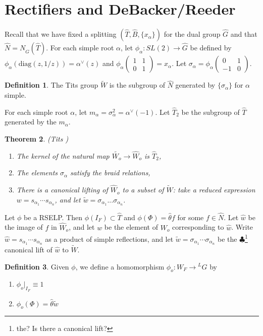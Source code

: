 \documentclass[11pt]{amsart}
\theoremstyle{plain}
\newtheorem{theorem}{Theorem}[section]
\newcommand{\MAxxx}[1]{$\clubsuit$\footnote{#1}}
\theoremstyle{definition}
\newtheorem{definition}[theorem]{Definition}
\newcommand{\mat}[4]{\left( \begin{array}{cc} {#1} & {#2} \\ {#3} & {#4}
\end{array} \right)}
\begin{document}
\section{Rectifiers and DeBacker/Reeder}\label{mainresults}

Recall that we have fixed a splitting $(\hat{T}, \hat{B}, \{x_{\alpha} \})$
for the dual group $\hat{G}$ and that $\hat{N} = N_{\hat{G}}(\hat{T})$.
For each simple root $\alpha$, let $\phi_{\alpha} : SL(2) \rightarrow \hat{G}$
be defined by $\phi_{\alpha}(\mathrm{diag}(z,1/z)) = \alpha^{\vee}(z)$
and $\phi_{\alpha}\mat{1}{1}{0}{1} = x_{\alpha}$. Let
$\sigma_{\alpha} = \phi_{\alpha}\mat{0}{1}{-1}{0}$.

\begin{definition}
  The Tits group $\widetilde{W}$ is the subgroup of $\hat{N}$
  generated by $\{\sigma_{\alpha} \}$ for $\alpha$ simple.
\end{definition}

For each simple root $\alpha$, let $m_{\alpha} = \sigma_{\alpha}^2 = \alpha^{\vee}(-1)$.
Let $\hat{T}_2$ be the subgroup of $\hat{T}$ generated by the $m_{\alpha}$.

\begin{theorem}{(Tits \cite{tits})}
\begin{enumerate}

\item The kernel of the natural map $\widetilde{W_o} \rightarrow \hat{W}_o$
  is $\hat{T}_2$,
\item The elements $\sigma_{\alpha}$ satisfy the braid relations,
\item There is a canonical lifting of $\hat{W}_o$ to a subset of
  $\widetilde{W}$: take a reduced expression $w = s_{\alpha_1} \cdots s_{\alpha_n}$,
  and let $\tilde{w} = \sigma_{\alpha_1} ... \sigma_{\alpha_n}$.
\end{enumerate}
\end{theorem}

Let $\phi$ be a RSELP.  Then $\phi(I_F) \subset \hat{T}$ and
$\phi(\Phi) = \hat{\theta} f$ for some $f \in \hat{N}$.  Let $\hat{w}$
be the image of $f$ in $\hat{W}_o$, and let $w$ be the element of
$W_o$ corresponding to $\hat{w}$.  Write $\hat{w} = s_{\alpha_1} \cdots s_{\alpha_n}$
as a product of simple reflections, and let
$\tilde{w} = \sigma_{\alpha_1} \cdots \sigma_{\alpha_n}$ be the \MAxxx{the?  Is there
a canonical lift?}
canonical lift of $\hat{w}$ to $\widetilde{W}$.

\begin{definition}
Given $\phi$, we define a homomorphism $\phi_o : W_F \rightarrow {}^L G$ by
\begin{enumerate}
\item $\phi_o|_{I_F} \equiv 1$
\item $\phi_o(\Phi) = \hat{\theta} \tilde{w}$
\end{enumerate}
\end{definition}
\end{document}
